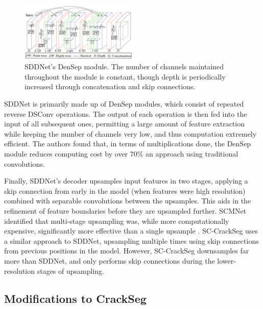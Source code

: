 \documentclass[a4paper,12pt]{report}
\begin{document}
\begin{figure}[ht!]
    \centering
    \includegraphics[width=0.5\textwidth]{res/sddnet-densep-module.png}
    \caption{SDDNet's \cite{choi_sddnet_2019} DenSep module. The number of channels maintained throughout the module is constant, though depth is periodically increased through concatenation and skip connections.}
    \label{fig:densep-module}
\end{figure}

SDDNet is primarily made up of DenSep modules, which consist of repeated reverse DSConv operations. The output of each operation is then fed into the input of all subsequent ones, permitting a large amount of feature extraction while keeping the number of channels very low, and thus computation extremely efficient. The authors found that, in terms of multiplications done, the DenSep module reduces computing cost by over 70\% an approach using traditional convolutions.

Finally, SDDNet's decoder upsamples input features in two stages, applying a skip connection from early in the model (when features were high resolution) combined with separable convolutions between the upsamples. This aids in the refinement of feature boundaries before they are upsampled further. SCMNet identified that multi-stage upsampling was, while more computationally expensive, significantly more effective than a single upsample \cite{singha_scmnet_2021}. SC-CrackSeg uses a similar approach to SDDNet, upsampling multiple times using skip connections from previous positions in the model. However, SC-CrackSeg downsamples far more than SDDNet, and only performs skip connections during the lower-resolution stages of upsampling.

\subsection{Modifications to CrackSeg}
\end{document}
